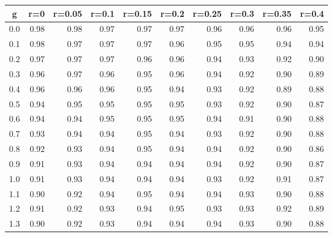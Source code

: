 %
\begin{table}[!tbp]
 \begin{center}
 \begin{tabular}{rrrrrrrrrr}\hline\hline
\multicolumn{1}{c}{g}&\multicolumn{1}{c}{r=0}&\multicolumn{1}{c}{r=0.05}&\multicolumn{1}{c}{r=0.1}&\multicolumn{1}{c}{r=0.15}&\multicolumn{1}{c}{r=0.2}&\multicolumn{1}{c}{r=0.25}&\multicolumn{1}{c}{r=0.3}&\multicolumn{1}{c}{r=0.35}&\multicolumn{1}{c}{r=0.4}\tabularnewline
\hline
0.0&0.98&0.98&0.97&0.97&0.97&0.96&0.96&0.96&0.95\tabularnewline
0.1&0.98&0.97&0.97&0.97&0.96&0.95&0.95&0.94&0.94\tabularnewline
0.2&0.97&0.97&0.97&0.96&0.96&0.94&0.93&0.92&0.90\tabularnewline
0.3&0.96&0.97&0.96&0.95&0.96&0.94&0.92&0.90&0.89\tabularnewline
0.4&0.96&0.96&0.96&0.95&0.94&0.93&0.92&0.89&0.88\tabularnewline
0.5&0.94&0.95&0.95&0.95&0.95&0.93&0.92&0.90&0.87\tabularnewline
0.6&0.94&0.94&0.95&0.95&0.95&0.94&0.91&0.90&0.88\tabularnewline
0.7&0.93&0.94&0.94&0.95&0.94&0.93&0.92&0.90&0.88\tabularnewline
0.8&0.92&0.93&0.94&0.95&0.94&0.94&0.92&0.90&0.86\tabularnewline
0.9&0.91&0.93&0.94&0.94&0.94&0.94&0.92&0.90&0.87\tabularnewline
1.0&0.91&0.93&0.94&0.94&0.94&0.93&0.92&0.91&0.87\tabularnewline
1.1&0.90&0.92&0.94&0.95&0.94&0.94&0.93&0.90&0.88\tabularnewline
1.2&0.91&0.92&0.93&0.94&0.95&0.93&0.93&0.92&0.89\tabularnewline
1.3&0.90&0.92&0.93&0.94&0.94&0.94&0.93&0.90&0.88\tabularnewline
\hline
\end{tabular}

\end{center}

\end{table}


